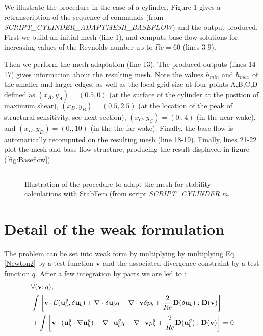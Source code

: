 \documentclass[twocolumn,10pt]{asme2ej}
\begin{document}
We illustrate the procedure in the case of a cylinder.  Figure 1 gives a retranscription of the sequence of commands (from {\em SCRIPT\_CYLINDER\_ADAPTMESH\_BASEFLOW}) 
and the output produced.
First we build an initial mesh (line 1), and compute base flow solutions for increasing values of the Reynolds number up to $Re = 60$ (lines 3-9).

Then we perform the mesh adaptation (line 13). The produced outputs (lines 14-17) gives information about the resulting mesh. 
Note the values $h_{min}$ and $h_{max}$ of the smaller and larger edges, as well as the local grid size at four points A,B,C,D defined as $(x_A,y_A) = (0.5,0)$ (at the surface of the cylinder at the position of maximum shear), $(x_B,y_B) = (0.5,2.5)$ (at the location of the peak of structural sensitivity, see next section), $(x_C,y_C) = (0.,4)$ (in the near wake), and $(x_D,y_D) = (0.,10)$ (in the the far wake). Finally, the base flow is automatically recomputed on the resulting mesh (line 18-19). Finally, lines 21-22 plot the mesh and base flow structure, producing the result displayed in figure (\ref{fig:Baseflow}).



\begin{figure*}
\small
\begin{lstlisting}
\end{lstlisting}
\normalsize

\caption{Illustration of the procedure to adapt the mesh for stability calculations with StabFem (from script {\em SCRIPT\_CYLINDER.m}. }
\label{listing3}
\end{figure*}


\section{Detail of the weak formulation}
The problem can be set into weak form by multiplying by multiplying Eq. \ref{Newton2} by a test function ${\bf v}$ and the associated divergence constraint by a test function $q$. After a few integration by parts we are led to :
\begin{eqnarray}
\label{NewtonWeak}
&\forall ({\bf v};q), \\
\displaystyle &\int \left[ {\bf v} \cdot {\cal C}( {\bf u}_b^g , \delta {\bf u}_b) +  \nabla  \cdot \delta {\bf u}_b q -\nabla  \cdot {\bf v} \delta p_b
+ \frac{2}{Re} {\bf D}(\delta {\bf u}_b) : {\bf D}({\bf v}) \right]
\nonumber
\\
\nonumber
\displaystyle & + \int \left[ {\bf v} \cdot ( {\bf u}_b^g \cdot \nabla {\bf u}_b^g) 
+ \nabla \cdot {\bf u}_b^g  q 
- \nabla \cdot {\bf v} p_b^g
+ \frac{2}{Re} {\bf D}({\bf u}_b^g) : {\bf D}({\bf v}) \right] = 0 
\end{eqnarray}
\end{document}
